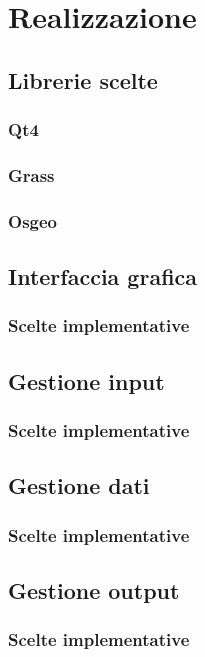 
\chapter{Realizzazione}
\label{cap:realizzazione}

\lipsum[1]

\section{Librerie scelte}
\lipsum[2]

\subsection{Qt4}
\subsection{Grass}
\subsection{Osgeo}

\section{Interfaccia grafica}
\lipsum[2]
\subsection{Scelte implementative}

\section{Gestione input}
\lipsum[3]
\subsection{Scelte implementative}

\section{Gestione dati}
\lipsum[4]
\subsection{Scelte implementative}

\section{Gestione output}
\lipsum[5]
\subsection{Scelte implementative}

